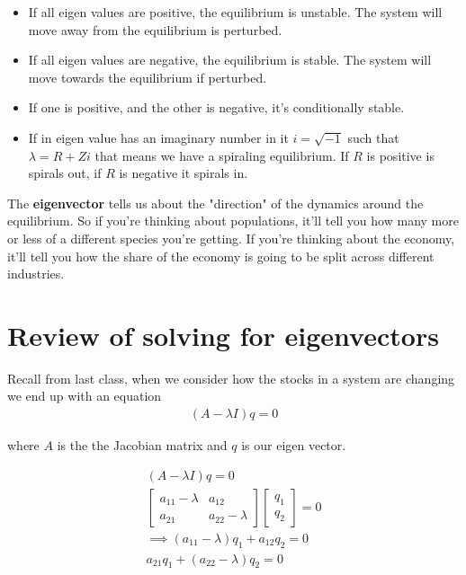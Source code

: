 \documentclass{article}
\begin{document}
\begin{itemize}
    \item If all eigen values are positive, the equilibrium is unstable. The system will move away from the equilibrium is perturbed.  
    \item If all eigen values are negative, the equilibrium is stable. The system will move towards the equilibrium if perturbed. 
    \item If one is positive, and the other is negative, it's conditionally stable.
    \item If in eigen value has an imaginary number in it $i = \sqrt{-1}$ such that $\lambda = R + Zi$ that means we have a spiraling equilibrium. If $R$ is positive is spirals out, if $R$ is negative it spirals in. 
\end{itemize}

The \textbf{eigenvector} tells us about the "direction" of the dynamics around the equilibrium. So if you're thinking about populations, it'll tell you how many more or less of a different species you're getting. If you're thinking about the economy, it'll tell you how the share of the economy is going to be split across different industries.


\section{Review of solving for eigenvectors}
Recall from last class, when we consider how the stocks in a system are changing we end up with an equation 
\begin{align}
    (A - \lambda I) q = 0 
\end{align}

where $A$ is the the Jacobian matrix and $q$ is our eigen vector. 

\begin{align}
    (A - \lambda I ) q = 0 \\
    \begin{bmatrix}
        a_{11} - \lambda & a_{12} \\
        a_{21} & a_{22} - \lambda
    \end{bmatrix}
    \begin{bmatrix}
        q_1 \\
        q_2
    \end{bmatrix} = 0 \\
    \implies (a_{11} - \lambda) q_1 + a_{12} q_2 = 0 \label{system_1} \\
    a_{21} q_1 + (a_{22} - \lambda) q_2 = 0 \label{system_2}
\end{align}
\end{document}
